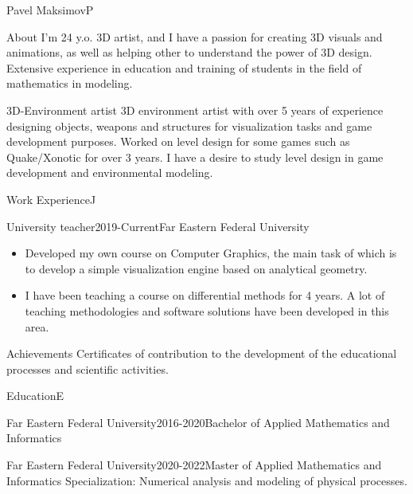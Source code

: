\documentclass[10pt]{extarticle}
\begin{document}
	\begin{centralpart}{Pavel Maksimov}{P}{}
		\begin{titleblock}{About}{}{}{}
			I'm 24 y.o. 3D artist, and I have a passion for creating 3D visuals and animations, as well as helping other to understand the power of 3D design. Extensive experience in education and training of students in the field of mathematics in modeling.
		\end{titleblock}

		\begin{titleblock}{3D-Environment artist}{}{}{}
			3D environment artist with over 5 years of experience designing objects, weapons and structures for visualization tasks and game development purposes. Worked on level design for some games such as Quake/Xonotic for over 3 years. I have a desire to study level design in game development and environmental modeling.
		\end{titleblock}
	\end{centralpart}

	\setlength{\currentpos}{\getposy}
	
	\begin{centralpart}{Work Experience}{J}{}
		\begin{titleblock}{University teacher}{2019-Current}{Far Eastern Federal University}{}
			\begin{itemize}[label=$\circ$]
				\item Developed my own course on Computer Graphics, the main task of which is to develop a simple visualization engine based on analytical geometry.
				\item I have been teaching a course on differential methods for 4 years. A lot of teaching methodologies and software solutions have been developed in this area.
			\end{itemize}
		\end{titleblock}
		\begin{titleblock}{Achievements}{}{}{}
			Certificates of contribution to the development of the educational processes and scientific activities.
		\end{titleblock}
	\end{centralpart}

	\setlength{\currentpos}{\getposy}
	
	\begin{centralpart}{Education}{E}{}
		\begin{titleblock}{Far Eastern Federal University}{2016-2020}{Bachelor of Applied Mathematics and Informatics}{}
		\end{titleblock}
		\begin{titleblock}{Far Eastern Federal University}{2020-2022}{Master of Applied Mathematics and Informatics}{}
			Specialization: Numerical analysis and modeling of physical processes.
		\end{titleblock}
	\end{centralpart}
\end{document}
